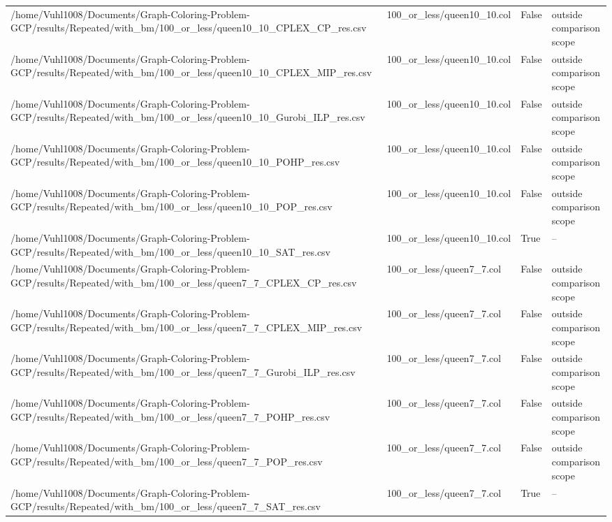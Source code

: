 \begin{table}[htbp]
\begin{tabular}{llll}
/home/Vuhl1008/Documents/Graph-Coloring-Problem-GCP/results/Repeated/with\_bm/100\_or\_less/queen10\_10\_CPLEX\_CP\_res.csv & 100\_or\_less/queen10\_10.col & False & outside comparison scope \\
/home/Vuhl1008/Documents/Graph-Coloring-Problem-GCP/results/Repeated/with\_bm/100\_or\_less/queen10\_10\_CPLEX\_MIP\_res.csv & 100\_or\_less/queen10\_10.col & False & outside comparison scope \\
/home/Vuhl1008/Documents/Graph-Coloring-Problem-GCP/results/Repeated/with\_bm/100\_or\_less/queen10\_10\_Gurobi\_ILP\_res.csv & 100\_or\_less/queen10\_10.col & False & outside comparison scope \\
/home/Vuhl1008/Documents/Graph-Coloring-Problem-GCP/results/Repeated/with\_bm/100\_or\_less/queen10\_10\_POHP\_res.csv & 100\_or\_less/queen10\_10.col & False & outside comparison scope \\
/home/Vuhl1008/Documents/Graph-Coloring-Problem-GCP/results/Repeated/with\_bm/100\_or\_less/queen10\_10\_POP\_res.csv & 100\_or\_less/queen10\_10.col & False & outside comparison scope \\
/home/Vuhl1008/Documents/Graph-Coloring-Problem-GCP/results/Repeated/with\_bm/100\_or\_less/queen10\_10\_SAT\_res.csv & 100\_or\_less/queen10\_10.col & True & -- \\
/home/Vuhl1008/Documents/Graph-Coloring-Problem-GCP/results/Repeated/with\_bm/100\_or\_less/queen7\_7\_CPLEX\_CP\_res.csv & 100\_or\_less/queen7\_7.col & False & outside comparison scope \\
/home/Vuhl1008/Documents/Graph-Coloring-Problem-GCP/results/Repeated/with\_bm/100\_or\_less/queen7\_7\_CPLEX\_MIP\_res.csv & 100\_or\_less/queen7\_7.col & False & outside comparison scope \\
/home/Vuhl1008/Documents/Graph-Coloring-Problem-GCP/results/Repeated/with\_bm/100\_or\_less/queen7\_7\_Gurobi\_ILP\_res.csv & 100\_or\_less/queen7\_7.col & False & outside comparison scope \\
/home/Vuhl1008/Documents/Graph-Coloring-Problem-GCP/results/Repeated/with\_bm/100\_or\_less/queen7\_7\_POHP\_res.csv & 100\_or\_less/queen7\_7.col & False & outside comparison scope \\
/home/Vuhl1008/Documents/Graph-Coloring-Problem-GCP/results/Repeated/with\_bm/100\_or\_less/queen7\_7\_POP\_res.csv & 100\_or\_less/queen7\_7.col & False & outside comparison scope \\
/home/Vuhl1008/Documents/Graph-Coloring-Problem-GCP/results/Repeated/with\_bm/100\_or\_less/queen7\_7\_SAT\_res.csv & 100\_or\_less/queen7\_7.col & True & -- \\

\end{tabular}
\end{table}

